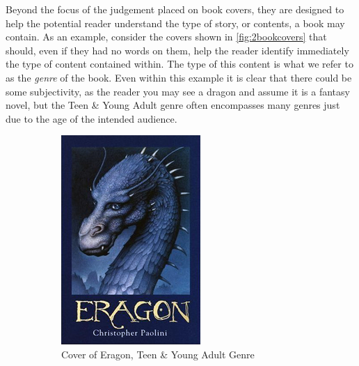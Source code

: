 \documentclass[12pt]{article}
\numberwithin{equation}{section}
\numberwithin{figure}{section}
\begin{document}
Beyond the focus of the judgement placed on book covers, they are designed to help the potential reader understand the type of story, or contents, a book may contain. As an example, consider the covers shown in \cref{fig:2bookcovers} that should, even if they had no words on them, help the reader identify immediately the type of content contained within. The type of this content is what we refer to as the \emph{genre} of the book. Even within this example it is clear that there could be some subjectivity, as the reader you may see a dragon and assume it is a fantasy novel, but the Teen \& Young Adult genre often encompasses many genres just due to the age of the intended audience. 
\begin{figure}[t!]
    \centering
    \begin{subfigure}[t]{0.5\textwidth}
        \centering
        \includegraphics[width=.8\linewidth]{200px-Eragon_book_cover.png}  
	  \caption{Cover of Eragon, Teen \& Young Adult Genre}
    \end{subfigure}%
    ~ 
    \begin{subfigure}[t]{0.5\textwidth}
        \centering

\end{subfigure}
\end{figure}
\end{document}
